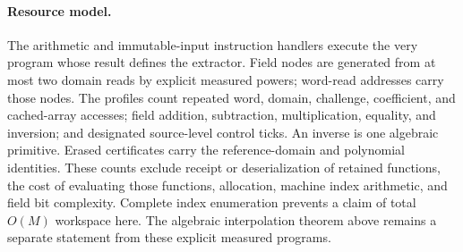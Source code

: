 \paragraph{Resource model.}
The arithmetic and immutable-input instruction handlers execute the very program
whose result defines the extractor. Field nodes are generated from at most two
domain reads by explicit measured powers; word-read addresses carry those nodes.
The profiles count repeated word, domain, challenge, coefficient, and cached-array
accesses; field addition, subtraction, multiplication, equality, and inversion;
and designated source-level control ticks. An inverse is one algebraic primitive.
Erased certificates carry the reference-domain and polynomial identities.
These counts exclude receipt or deserialization of retained functions, the cost
of evaluating those functions, allocation, machine index arithmetic, and field
bit complexity. Complete index enumeration prevents a claim of total $O(M)$
workspace here. The algebraic interpolation theorem above remains a separate
statement from these explicit measured programs.

